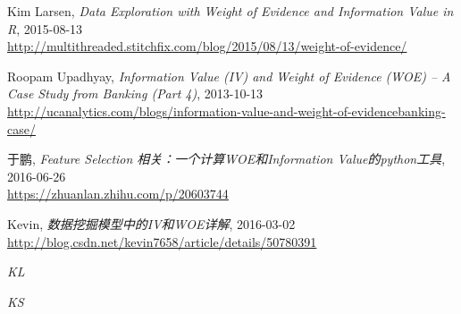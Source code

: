\documentclass[a4paper,UTF8]{ctexart}
\begin{document}
    
\begin{thebibliography}{9}

  Kim Larsen,
  \textit{Data Exploration with Weight of Evidence and Information Value in R},
  2015-08-13\\
  \url{http://multithreaded.stitchfix.com/blog/2015/08/13/weight-of-evidence/}
  
  Roopam Upadhyay,
  \textit{Information Value (IV) and Weight of Evidence (WOE) – A Case Study from Banking (Part 4)},
  2013-10-13\\
  \url{http://ucanalytics.com/blogs/information-value-and-weight-of-evidencebanking-case/}
  
  于鹏,
  \textit{Feature Selection 相关：一个计算WOE和Information Value的python工具},
  2016-06-26\\
  \url{https://zhuanlan.zhihu.com/p/20603744}
  
  Kevin,
  \textit{数据挖掘模型中的IV和WOE详解},
  2016-03-02\\
  \url{http://blog.csdn.net/kevin7658/article/details/50780391}
  
  \textit{KL}
  
  \textit{KS}

\end{thebibliography}
\end{document}
